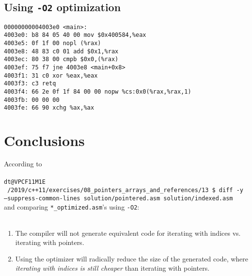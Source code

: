 \documentclass{article}
\begin{document}
    \subsection*{Using \texttt{-O2} optimization}
   \texttt{00000000004003e0 <main>:}
  \\\texttt{4003e0:	b8 84 05 40 00       	mov    \$0x400584,\%eax}
  \\\texttt{4003e5:	0f 1f 00             	nopl   (\%rax)}
  \\\texttt{4003e8:	48 83 c0 01          	add    \$0x1,\%rax}
  \\\texttt{4003ec:	80 38 00             	cmpb   \$0x0,(\%rax)}
  \\\texttt{4003ef:	75 f7                	jne    4003e8 <main+0x8>}
  \\\texttt{4003f1:	31 c0                	xor    \%eax,\%eax}
  \\\texttt{4003f3:	c3                   	retq}   
  \\\texttt{4003f4:	66 2e 0f 1f 84 00 00 	nopw   \%cs:0x0(\%rax,\%rax,1)}
  \\\texttt{4003fb:	00 00 00 }
  \\\texttt{4003fe:	66 90                	xchg   \%ax,\%ax}

   
   \pagebreak
   
   \section*{Conclusions}
   According to
   \\
   \\\texttt{dt@VPCF11M1E ~/2019/c++11/exercises/08\_pointers\_arrays\_and\_references/13 \$ diff -y --suppress-common-lines solution/pointered.asm solution/indexed.asm}
   \\
   and comparing \texttt{*\_optimized.asm}'s using \texttt{-O2}:
   \\
   \\
   \begin{enumerate}
    \item The compiler will not generate equivalent code for iterating with indices vs. iterating with pointers.
    \item Using the optimizer will radically reduce the size of the generated code, where  \textsl{iterating with indices is still cheaper} than iterating with pointers.
   \end{enumerate}

  
 
\end{document}
